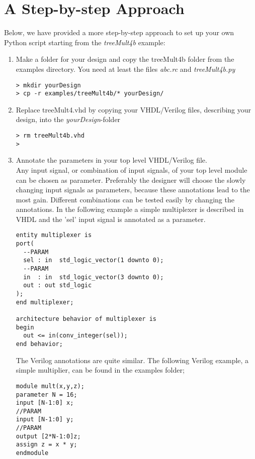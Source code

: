\documentclass[a4paper,oneside]{memoir}
\begin{document}
\section{A Step-by-step Approach}\label{sec:step_by_step}
Below, we have provided a more step-by-step approach to set up your own Python script starting from the \emph{treeMult4b} example:
\begin{enumerate}
\item Make a folder for your design and copy the treeMult4b folder from the examples directory. You need at least the files \emph{abc.rc} and \emph{treeMult4b.py}\\
\begin{lstlisting}
> mkdir yourDesign
> cp -r examples/treeMult4b/* yourDesign/
\end{lstlisting}
\item Replace treeMult4.vhd by copying your VHDL/Verilog files, describing your design, into the \emph{yourDesign}-folder\\
\begin{lstlisting}
> rm treeMult4b.vhd
> 
\end{lstlisting}
\item Annotate the parameters in your top level VHDL/Verilog file.\\

Any input signal, or combination of input signals, of your top level module can be chosen as parameter. Preferably the designer will choose the slowly changing input signals as parameters, because these annotations lead to the most gain. Different combinations can be tested easily by changing the annotations. In the following example a simple multiplexer is described in VHDL and the 'sel' input signal is annotated as a parameter.
\lstset{language=VHDL}
\begin{lstlisting}
entity multiplexer is
port(
  --PARAM
  sel : in  std_logic_vector(1 downto 0);
  --PARAM
  in  : in  std_logic_vector(3 downto 0);
  out : out std_logic
);
end multiplexer;

architecture behavior of multiplexer is
begin
  out <= in(conv_integer(sel));
end behavior;
\end{lstlisting}
The Verilog annotations are quite similar. The following Verilog example, a simple multiplier, can be found in the examples folder;
\lstset{language=Verilog}
\begin{lstlisting}
module mult(x,y,z);
parameter N = 16;
input [N-1:0] x;
//PARAM
input [N-1:0] y;
//PARAM
output [2*N-1:0]z;
assign z = x * y;
endmodule
\end{lstlisting}
 

\end{enumerate}
\end{document}
